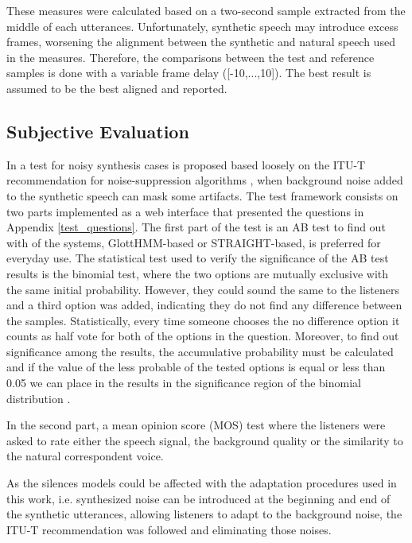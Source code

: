 These measures were calculated based on a two-second sample extracted from the middle of each utterances. 
%
Unfortunately, synthetic speech may introduce excess frames, worsening the alignment between the synthetic and natural speech used in the measures.
%
Therefore, the comparisons between the test and reference samples is done with a variable frame delay ([-10,...,10]). 
%
The best result is assumed to be the best aligned and reported.

\subsection{Subjective Evaluation}
\label{evaluation_subjective}
In \cite{karhila_remes_icassp13} a test for noisy synthesis cases is proposed based loosely on the ITU-T recommendation for noise-suppression algorithms \cite{itut835}, when background noise added to the synthetic speech can mask some artifacts.
%
The test framework consists on two parts implemented as a web interface that presented the questions in Appendix \ref{test_questions}.
%
The first part of the test is an AB test to find out with of the systems, GlottHMM-based or STRAIGHT-based, is preferred for everyday use.
%
The statistical test used to verify the significance of the AB test results is the binomial test, where the two options are mutually exclusive with the same initial probability.
%
However, they could sound the same to the listeners and a third option was added, indicating they do not find any difference between the samples.
%
Statistically, every time someone chooses the no difference option it counts as half vote for both of the options in the question.
%
Moreover, to find out significance among the results, the accumulative probability must be calculated and if the value of the less probable of the tested options is equal or less than 0.05 we can place in the results in the significance region of the binomial distribution \cite{howell2012statistical}.

In the second part, a mean opinion score (MOS) test where the listeners were asked to rate either the speech signal, the background quality or the similarity to the natural correspondent voice.

As the silences models could be affected with the adaptation procedures used in this work, i.e. synthesized noise can be introduced at the beginning and end of the synthetic utterances, allowing listeners to adapt to the background noise, the ITU-T recommendation \cite{itut835} was followed and eliminating those noises.